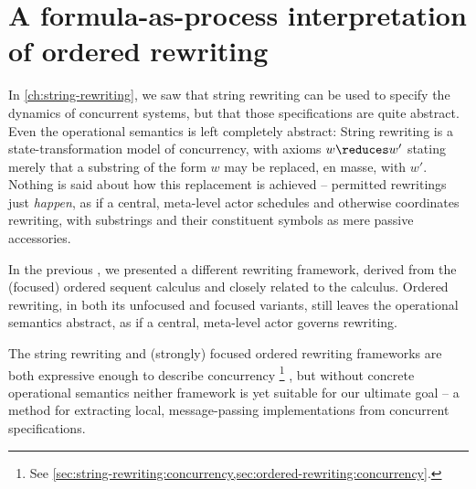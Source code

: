 \chapter{A formula-as-process interpretation of ordered rewriting}\label{ch:formula-as-process}\label{ch:choreographies}



In \cref{ch:string-rewriting}, we saw that string rewriting can be used to specify the dynamics of concurrent systems, but that those specifications are quite abstract.
Even the operational semantics is left completely abstract:
String rewriting is a state-transformation model of concurrency, with axioms $w \reduces w'$
stating merely that a substring of the form $w$ may be replaced, en masse, with $w'$.
Nothing is said about how this replacement is achieved -- permitted rewritings just \emph{happen}, as if a central, meta-level actor schedules and otherwise coordinates rewriting, with substrings and their constituent symbols as mere passive accessories.

In the previous , we presented a different rewriting framework, derived from the (focused) ordered sequent calculus and closely related to the \citeauthor{Lambek:AMM58} calculus\autocite{Lambek:AMM58}.
Ordered rewriting, in both its unfocused and focused variants, still leaves the operational semantics abstract, as if a central, meta-level actor governs rewriting.

The string rewriting and (strongly) focused ordered rewriting frameworks are both expressive enough to describe concurrency%
\footnote{See \cref{sec:string-rewriting:concurrency,sec:ordered-rewriting:concurrency}.}%
, but without concrete operational semantics neither framework is yet suitable for our ultimate goal -- a method for extracting local, message-passing implementations from concurrent specifications.


